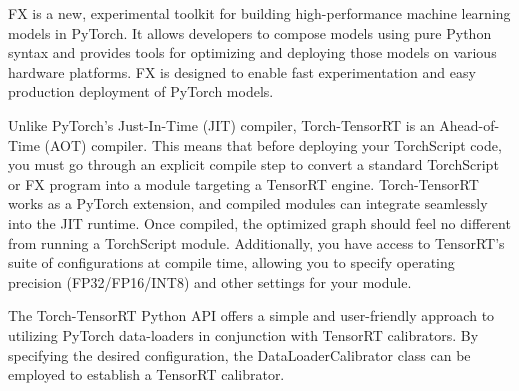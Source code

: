 FX is a new, experimental toolkit for building high-performance machine learning models in PyTorch. It allows developers to compose models using pure Python syntax and provides tools for optimizing and deploying those models on various hardware platforms. FX is designed to enable fast experimentation and easy production deployment of PyTorch models.

Unlike PyTorch's Just-In-Time (JIT) compiler, Torch-TensorRT is an Ahead-of-Time (AOT) compiler. This means that before deploying your TorchScript code, you must go through an explicit compile step to convert a standard TorchScript or FX program into a module targeting a TensorRT engine. Torch-TensorRT works as a PyTorch extension, and compiled modules can integrate seamlessly into the JIT runtime. Once compiled, the optimized graph should feel no different from running a TorchScript module. Additionally, you have access to TensorRT's suite of configurations at compile time, allowing you to specify operating precision (FP32/FP16/INT8) and other settings for your module.

The Torch-TensorRT Python API offers a simple and user-friendly approach to utilizing PyTorch data-loaders in conjunction with TensorRT calibrators. By specifying the desired configuration, the DataLoaderCalibrator class can be employed to establish a TensorRT calibrator.






